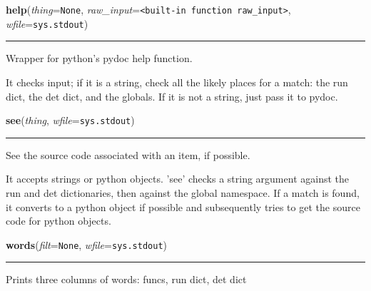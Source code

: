     \begin{boxedminipage}{\textwidth}

    \raggedright \textbf{help}(\textit{thing}=\texttt{None}, \textit{raw\_input}=\texttt{{\textless}built-in function raw\_input{\textgreater}}, \textit{wfile}=\texttt{sys.stdout})

    \vspace{-1.5ex}

    \rule{\textwidth}{0.5\fboxrule}
    Wrapper for python's pydoc help function.

    It checks input; if it is a string, check all the likely places for a 
    match: the run dict, the det dict, and the globals. If it is not a 
    string, just pass it to pydoc.

    \vspace{1ex}

    \end{boxedminipage}

    \label{pydsp:see}

    \vspace{0.5ex}

    \begin{boxedminipage}{\textwidth}

    \raggedright \textbf{see}(\textit{thing}, \textit{wfile}=\texttt{sys.stdout})

    \vspace{-1.5ex}

    \rule{\textwidth}{0.5\fboxrule}
    See the source code associated with an item, if possible.

    It accepts strings or python objects. 'see' checks a string argument 
    against the run and det dictionaries, then against the global 
    namespace. If a match is found, it converts to a python object if 
    possible and subsequently tries to get the source code for python 
    objects.

    \vspace{1ex}

    \end{boxedminipage}

    \label{pydsp:words}

    \vspace{0.5ex}

    \begin{boxedminipage}{\textwidth}

    \raggedright \textbf{words}(\textit{filt}=\texttt{None}, \textit{wfile}=\texttt{sys.stdout})

    \vspace{-1.5ex}

    \rule{\textwidth}{0.5\fboxrule}
    Prints three columns of words: funcs, run dict, det dict

    \vspace{1ex}

    \end{boxedminipage}

